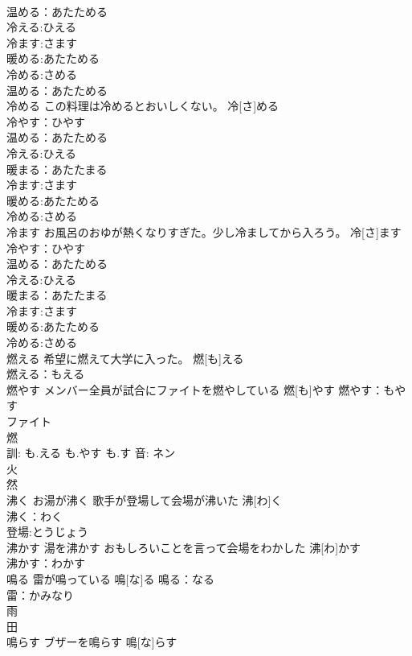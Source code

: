 \documentclass[8pt]{extreport}
\begin{document}
\begin{CJK}{UTF8}{min}
\\	温める：あたためる
\\	冷える:ひえる
\\	冷ます:さます
\\	暖める:あたためる
\\	冷める:さめる
\\	温める：あたためる
\\	冷める	この料理は冷めるとおいしくない。	冷[さ]める	
\\	冷やす：ひやす
\\	温める：あたためる
\\	冷える:ひえる
\\	暖まる：あたたまる
\\	冷ます:さます
\\	暖める:あたためる
\\	冷める:さめる
\\	冷ます	お風呂のおゆが熱くなりすぎた。少し冷ましてから入ろう。	冷[さ]ます	
\\	冷やす：ひやす
\\	温める：あたためる
\\	冷える:ひえる
\\	暖まる：あたたまる
\\	冷ます:さます
\\	暖める:あたためる
\\	冷める:さめる
\\	燃える	希望に燃えて大学に入った。	燃[も]える	
\\	燃える：もえる
\\	燃やす	メンバー全員が試合にファイトを燃やしている	燃[も]やす			燃やす：もやす
\\	ファイト
\\	燃 
\\	訓: も.える も.やす も.す 音: ネン 
\\	火 
\\	然 
\\	沸く	お湯が沸く 歌手が登場して会場が沸いた	沸[わ]く	
\\	沸く：わく
\\	登場:とうじょう
\\	沸かす	湯を沸かす おもしろいことを言って会場をわかした	沸[わ]かす	
\\	沸かす：わかす
\\	鳴る	雷が鳴っている	鳴[な]る			鳴る：なる
\\	雷：かみなり
\\	雨 
\\	田 
\\	鳴らす	ブザーを鳴らす	鳴[な]らす	

\end{CJK}
\end{document}
